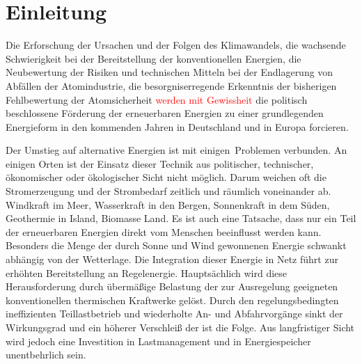 \chapter{Einleitung}
\label{chap:einleitung}

%

Die Erforschung der Ursachen und der Folgen des Klimawandels, die wachsende
Schwierigkeit bei der Bereitstellung der konventionellen Energien, die Neubewertung der Risiken und technischen Mitteln bei
der Endlagerung von Abfällen der Atomindustrie, die besorgniserregende Erkenntnis der bisherigen Fehlbewertung der
Atomsicherheit \textcolor{red}{werden mit Gewissheit} die politisch beschlossene Förderung der erneuerbaren Energien zu einer
grundlegenden Energieform in den kommenden Jahren in Deutschland und in Europa forcieren.

Der Umstieg auf alternative Energien ist mit einigen$\,$ Problemen verbunden. An einigen Orten ist
der Einsatz dieser Technik aus politischer, technischer, ökonomischer oder ökologischer Sicht nicht möglich. Darum weichen
oft die Stromerzeugung und der Strombedarf zeitlich und räumlich voneinander ab. Windkraft im Meer, Wasserkraft in den
Bergen, Sonnenkraft in dem Süden, Geothermie in Island, Biomasse Land. Es ist auch
eine Tatsache, dass nur ein Teil der erneuerbaren Energien direkt vom Menschen beeinflusst werden kann. Besonders die Menge
der durch Sonne und Wind gewonnenen Energie schwankt abhängig von der Wetterlage. Die Integration dieser Energie in Netz
führt zur erhöhten Bereitstellung an Regelenergie. Hauptsächlich wird diese Herausforderung durch übermäßige Belastung der
zur Ausregelung geeigneten konventionellen thermischen Kraftwerke gelöst. Durch den regelungsbedingten ineffizienten
Teillastbetrieb und wiederholte An- und Abfahrvorgänge sinkt der Wirkungsgrad und ein höherer Verschleiß der ist die Folge.
Aus langfristiger Sicht wird jedoch eine Investition in
Lastmanagement und in Energiespeicher unentbehrlich sein.

